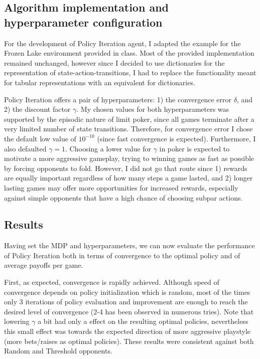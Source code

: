 \subsection{Algorithm implementation and hyperparameter configuration}

For the development of Policy Iteration agent, I adapted the example for the Frozen Lake environment provided in class. Most of the provided implementation remained unchanged, however since I decided to use dictionaries for the representation of state-action-transitions, I had to replace the functionality meant for tabular representations with an equivalent for dictionaries.

Policy Iteration offers a pair of hyperparameters: 1) the convergence error $\delta$, and 2) the discount factor $\gamma$. My chosen values for both hyperparameters was supported by the episodic nature of limit poker, since all games terminate after a very limited number of state transitions. Therefore, for convergence error I chose the default low value of $10^{-10}$ (since fast convergence is expected). Furthermore, I also defaulted $\gamma=1$. Choosing a lower value for $\gamma$ in poker is expected to motivate a more aggressive gameplay, trying to winning games as fast as possible by forcing opponents to fold. However, I did not go that route since 1) rewards are equally important regardless of how many steps a game lasted, and 2) longer lasting games may offer more opportunities for increased rewards, especially against simple opponents that have a high chance of choosing subpar actions.

\subsection{Results}

Having set the MDP and hyperparameters, we can now evaluate the performance of Policy Iteration both in terms of convergence to the optimal policy and of average payoffs per game.

First, as expected, convergence is rapidly achieved. Although speed of convergence depends on policy initialization which is random, most of the times only 3 iterations of policy evaluation and improvement are enough to reach the desired level of convergence (2-4 has been observed in numerous tries). Note that lowering $\gamma$ a bit had only a effect on the resulting optimal policies, nevertheless this small effect was towards the expected direction of more aggressive playstyle (more bets/raises as optimal policies). These results were consistent against both Random and Threshold opponents.

